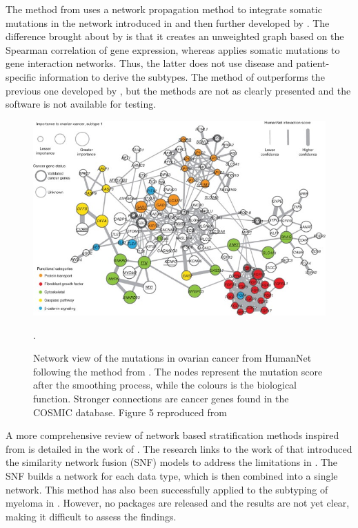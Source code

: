 The method from \citet{He2017-dj} uses a network propagation method to integrate somatic mutations in the network introduced in \citet{Vanunu2010-el} and then further developed by \citet{Hofree2013-ld}. The difference brought about by \citet{He2017-dj} is that it creates an unweighted graph based on the Spearman correlation of gene expression, whereas \citet{Hofree2013-ld} applies somatic mutations to gene interaction networks. Thus, the latter does not use disease and patient-specific information to derive the subtypes. The method of \citet{He2017-dj} outperforms the previous one developed by \citet{Hofree2013-ld}, but the methods are not as clearly presented and the software is not available for testing.

\begin{figure}[!b]
    \centering
    \includegraphics[width=1.0\textwidth,keepaspectratio]{Sections/Lit_review/Resources/hofree_fig_5.jpg}
    \caption[HumanNet: network of the mutations in ovarian cancer]{Network view of the mutations in ovarian cancer from HumanNet following the method from \citet{Hofree2013-ld}. The nodes represent the mutation score after the smoothing process, while the colours is the biological function. Stronger connections are cancer genes found in the COSMIC database. Figure 5 reproduced from \citet{Hofree2013-ld}}.
    \label{fig:lit:hofree}
\end{figure}



A more comprehensive review of network based stratification methods inspired from \citet{Hofree2013-ld, He2017-dj} is detailed in the work of \citet{Petti2023-qo}. The research links to the work of \citet{Wang2014-wr} that introduced the similarity network fusion (SNF) models to address the limitations in \citet{Hofree2013-ld}. The SNF builds a network for each data type, which is then combined into a single network. This method has also been successfully applied to the subtyping of myeloma in \citet{Bhalla2021-uv}. However, no packages are released and the results are not yet clear, making it difficult to assess the findings.

